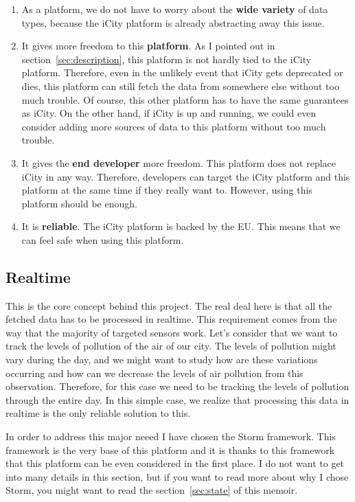 \begin{enumerate}
  \itemsep0em
  \item As a platform, we do not have to worry about the {\bf wide variety} of
data types, because the iCity platform is already abstracting away this issue.
  \item It gives more freedom to this {\bf platform}. As I pointed out in
section~\ref{sec:description}, this platform is not hardly tied to the iCity
platform. Therefore, even in the unlikely event that iCity gets deprecated or
dies, this platform can still fetch the data from somewhere else without too
much trouble. Of course, this other platform has to have the same guarantees as
iCity. On the other hand, if iCity is up and running, we could even consider
adding more sources of data to this platform without too much trouble.
  \item It gives the {\bf end developer} more freedom. This platform does not
replace iCity in any way. Therefore, developers can target the iCity platform
and this platform at the same time if they really want to. However, using this
platform should be enough.
  \item It is {\bf reliable}. The iCity platform is backed by the \ac{EU}. This
means that we can feel safe when using this platform.
\end{enumerate}

\subsection{Realtime}

This is the core concept behind this project. The real deal here is that all
the fetched data has to be processed in realtime. This requirement comes from
the way that the majority of targeted sensors work. Let's consider that we want
to track the levels of pollution of the air of our city. The levels of
pollution might vary during the day, and we might want to study how are these
variations occurring and how can we decrease the levels of air pollution from
this observation. Therefore, for this case we need to be tracking the levels of
pollution through the entire day. In this simple case, we realize that
processing this data in realtime is the only reliable solution to this.

In order to address this major neeed I have chosen the Storm framework. This
framework is the very base of this platform and it is thanks to this framework
that this platform can be even considered in the first place. I do not
want to get into many details in this section, but if you want to read more
about why I chose Storm, you might want to read the section~\ref{sec:state} of
this memoir.
